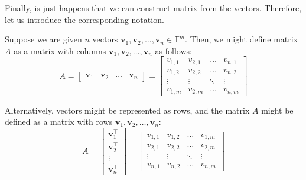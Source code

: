 \documentclass[../lecture-notes-148x210.tex]{subfiles}
\begin{document}
Finally, is just happens that we can construct matrix from the vectors. Therefore, let us introduce the corresponding notation.
\begin{definition}
    Suppose we are given $n$ vectors $\mathbf{v}_1,\mathbf{v}_2,\dots,\mathbf{v}_n \in \mathbb{F}^m$. Then, we might define matrix $A$ as a matrix with columns $\mathbf{v}_1,\mathbf{v}_2,\dots,\mathbf{v}_n$ as follows:
    \begin{equation*}
        A = \begin{bmatrix}
            \mathbf{v}_1 & \mathbf{v}_2 & \dots & \mathbf{v}_n
        \end{bmatrix} = \begin{bmatrix}
            v_{1,1} & v_{2,1} & \dots & v_{n,1} \\
            v_{1,2} & v_{2,2} & \dots & v_{n,2} \\
            \vdots & \vdots & \ddots & \vdots \\
            v_{1,m} & v_{2,m} & \dots & v_{n,m}
        \end{bmatrix}
    \end{equation*}

    Alternatively, vectors might be represented as rows, and the matrix $A$ might be defined as a matrix with rows $\mathbf{v}_1,\mathbf{v}_2,\dots,\mathbf{v}_n$:
    \begin{equation*}
        A = \begin{bmatrix}
            \mathbf{v}_1^{\top} \\ \mathbf{v}_2^{\top} \\ \vdots \\ \mathbf{v}_n^{\top}
        \end{bmatrix} = \begin{bmatrix}
            v_{1,1} & v_{1,2} & \dots & v_{1,m} \\
            v_{2,1} & v_{2,2} & \dots & v_{2,m} \\
            \vdots & \vdots & \ddots & \vdots \\
            v_{n,1} & v_{n,2} & \dots & v_{n,m}
        \end{bmatrix}
    \end{equation*}
\end{definition}
\end{document}

